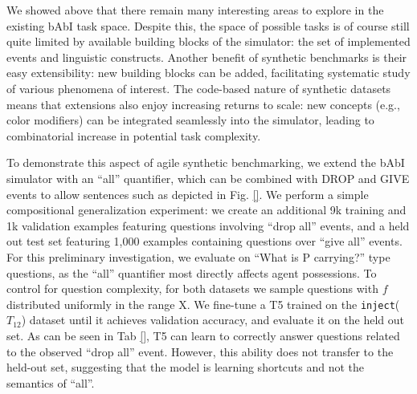 
We showed above that there remain many interesting areas to explore in the existing bAbI task space. Despite this, the space of possible tasks is of course still quite limited by available building blocks of the simulator: the set of implemented events and linguistic constructs. Another benefit of synthetic benchmarks is their easy extensibility: new building blocks can be added, facilitating  systematic study of various phenomena of interest. The code-based nature of synthetic datasets means that extensions also enjoy increasing returns to scale: new concepts (e.g., color modifiers) can be integrated seamlessly into the simulator, leading to combinatorial increase in potential task complexity.


To demonstrate this aspect of agile synthetic benchmarking, we extend the bAbI simulator with an ``all'' quantifier, which can be combined with DROP and GIVE events to allow sentences such as depicted in Fig. \ref{}. We perform a simple compositional generalization experiment: we create an additional 9k training and 1k validation examples featuring questions involving ``drop all'' events, and a held out test set featuring 1,000 examples containing questions over ``give all'' events. For this preliminary investigation, we evaluate on ``What is P carrying?'' type questions, as the ``all'' quantifier most directly affects agent possessions. To control for question complexity, for both datasets we sample questions with $f$ distributed uniformly in the range X.  We fine-tune a T5 trained on the \texttt{inject}($T_{12}$) dataset until it achieves  validation accuracy, and evaluate it on the held out set. As can be seen in Tab \ref{}, T5 can learn to correctly answer questions related to the observed ``drop all'' event. However, this ability does not transfer to the held-out set, suggesting that the model is learning shortcuts and not the semantics of ``all''.